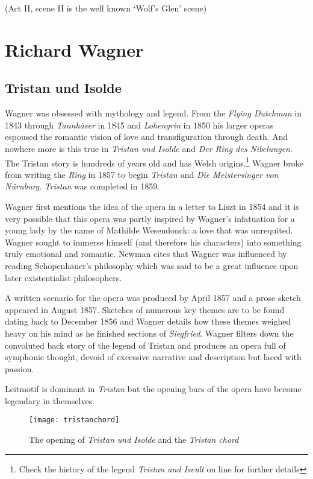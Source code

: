 (Act II, scene II is the well known `Wolf's Glen' scene)

\section{Richard Wagner}

\subsection{Tristan und Isolde} 
Wagner was obsessed with mythology and legend. From the \textit{Flying Dutchman} in 1843 through \textit{Tannh\"aser} in 1845 and \textit{Lohengrin} in 1850 his larger operas espoused the romantic vision of love and transfiguration through death. And nowhere more is this true in \textit{Tristan und Isolde} and \textit{Der Ring des Nibelungen}. The Tristan story is hundreds of years old and has Welsh origins.\footnote{Check the history of the legend \textit{Tristan and Iseult} on line for further details} Wagner broke from writing the \textit{Ring} in 1857 to begin \textit{Tristan} and \textit{Die Meistersinger von N\"urnburg}. \textit{Tristan} was completed in 1859. 

Wagner first mentions the idea of the opera in a letter to Liszt in 1854 and it is very possible that this opera was partly inspired by Wagner's infatuation for a young lady by the name of Mathilde Wesendonck: a love that was unrequited. Wagner sought to immerse himself (and therefore his characters) into something truly emotional and romantic. Newman \citeyearpar{newman1977wagner} cites that Wagner was influenced by reading Schopenhauer's philosophy which was said to be a great influence upon later existentialist philosophers. 

A written scenario for the opera was produced by April 1857 and a prose sketch appeared in August 1857. Sketches of numerous key themes are to be found dating back to December 1856 and Wagner details how these themes weighed heavy on his mind as he finished sections of \textit{Siegfried}. Wagner filters down the convoluted back story of the legend of Tristan and produces an opera full of symphonic thought, devoid of excessive narrative and description but laced with passion. 

Leitmotif is dominant in \textit{Tristan} but the opening bars of the opera have become legendary in themselves.

\begin{figure}[H]
\centering
\texttt{[image: tristanchord]}\caption{The opening of \textit{Tristan und Isolde} and the \textit{Tristan chord}}
\label{fig:tristanchord}
\end{figure}

